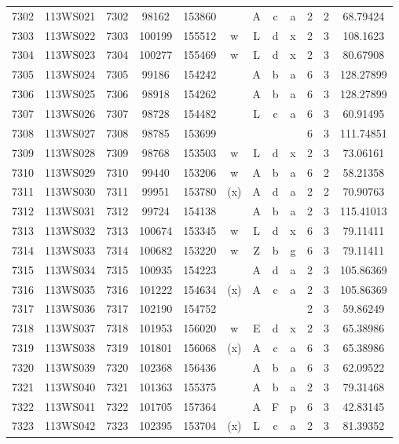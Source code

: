 \begin{tabular}{|*{12}{c|}}
7302 & 113WS021 & 7302 & 98162 & 153860 &  & A & c & a & 2 & 2 & 68.79424 \\ 
7303 & 113WS022 & 7303 & 100199 & 155512 & w & L & d & x & 2 & 3 & 108.1623 \\ 
7304 & 113WS023 & 7304 & 100277 & 155469 & w & L & d & x & 2 & 3 & 80.67908 \\ 
7305 & 113WS024 & 7305 & 99186 & 154242 &  & A & b & a & 6 & 3 & 128.27899 \\ 
7306 & 113WS025 & 7306 & 98918 & 154262 &  & A & b & a & 6 & 3 & 128.27899 \\ 
7307 & 113WS026 & 7307 & 98728 & 154482 &  & L & c & a & 6 & 3 & 60.91495 \\ 
7308 & 113WS027 & 7308 & 98785 & 153699 &  &  &  &  & 6 & 3 & 111.74851 \\ 
7309 & 113WS028 & 7309 & 98768 & 153503 & w & L & d & x & 2 & 3 & 73.06161 \\ 
7310 & 113WS029 & 7310 & 99440 & 153206 & w & A & b & a & 6 & 2 & 58.21358 \\ 
7311 & 113WS030 & 7311 & 99951 & 153780 & (x) & A & d & a & 2 & 2 & 70.90763 \\ 
7312 & 113WS031 & 7312 & 99724 & 154138 &  & A & b & a & 2 & 3 & 115.41013 \\ 
7313 & 113WS032 & 7313 & 100674 & 153345 & w & L & d & x & 6 & 3 & 79.11411 \\ 
7314 & 113WS033 & 7314 & 100682 & 153220 & w & Z & b & g & 6 & 3 & 79.11411 \\ 
7315 & 113WS034 & 7315 & 100935 & 154223 &  & A & d & a & 2 & 3 & 105.86369 \\ 
7316 & 113WS035 & 7316 & 101222 & 154634 & (x) & A & c & a & 2 & 3 & 105.86369 \\ 
7317 & 113WS036 & 7317 & 102190 & 154752 &  &  &  &  & 2 & 3 & 59.86249 \\ 
7318 & 113WS037 & 7318 & 101953 & 156020 & w & E & d & x & 2 & 3 & 65.38986 \\ 
7319 & 113WS038 & 7319 & 101801 & 156068 & (x) & A & c & a & 6 & 3 & 65.38986 \\ 
7320 & 113WS039 & 7320 & 102368 & 156436 &  & A & b & a & 6 & 3 & 62.09522 \\ 
7321 & 113WS040 & 7321 & 101363 & 155375 &  & A & b & a & 2 & 3 & 79.31468 \\ 
7322 & 113WS041 & 7322 & 101705 & 157364 &  & A & F & p & 6 & 3 & 42.83145 \\ 
7323 & 113WS042 & 7323 & 102395 & 153704 & (x) & L & c & a & 2 & 3 & 81.39352 \\ 

\end{tabular}
